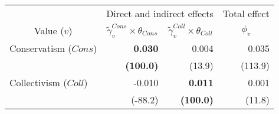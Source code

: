 
\begin{tabular}{lrrr}
\toprule
\multicolumn{1}{c}{ } & \multicolumn{2}{c}{Direct and indirect effects} & \multicolumn{1}{c}{Total effect} \\
\cmidrule(l{3pt}r{3pt}){2-3} \cmidrule(l{3pt}r{3pt}){4-4}
\multicolumn{1}{c}{Value ($v$)} & \multicolumn{1}{c}{$\widetilde{\gamma}^{Cons}_v \times \theta_{Cons}$} & \multicolumn{1}{c}{$\widetilde{\gamma}^{Coll}_v \times \theta_{Coll}$} & \multicolumn{1}{c}{${\phi}_v$}\\
\midrule
Conservatism ($Cons$) & \textbf{0.030} & 0.004 & 0.035\\
 & \textbf{(100.0)} & (13.9) & (113.9)\\
Collectivism ($Coll$) & -0.010 & \textbf{0.011} & 0.001\\
 & (-88.2) & \textbf{(100.0)} & (11.8)\\
\bottomrule
\end{tabular}
